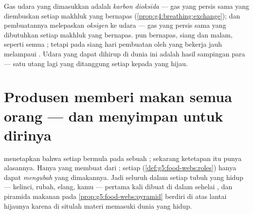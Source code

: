 \begin{remark}\label{rem:g6:plants-are-producers:gas}
Gas udara yang dimasukkan  adalah \emph{karbon dioksida} ---
gas yang persis sama yang diembuskan setiap makhluk yang bernapas
(\cref{prop:g4:breathing:exchange}); dan pembuatannya melepaskan
\emph{oksigen} ke udara --- gas yang persis sama yang dibutuhkan
setiap makhluk yang bernapas.  pun bernapas, siang dan malam,
seperti semua ; tetapi pada siang hari pembuatan oleh
 yang bekerja jauh melampaui . Udara yang dapat
dihirup di dunia ini adalah hasil sampingan para  --- satu
utang lagi yang ditanggung setiap  kepada yang hijau.
\end{remark}

\section{Produsen memberi makan semua orang --- dan menyimpan untuk dirinya}

\begin{proposition}\label{prop:g6:plants-are-producers:firstlink}
 menetapkan bahwa setiap  bermula pada sebuah ; sekarang ketetapan itu punya
alasannya. Hanya  yang membuat  dari ; setiap  (\cref{def:g5:food-webs:roles}) hanya dapat
\emph{mengubah}  yang dimakannya. Jadi seluruh  dalam setiap tubuh yang hidup --- kelinci, rubah, elang, kamu
--- pertama kali dibuat di dalam sehelai , dan piramida makanan
pada \cref{prop:g5:food-webs:pyramid} berdiri di atas lantai hijaunya
karena di situlah materi memasuki dunia yang hidup.
\end{proposition}
\admitted

